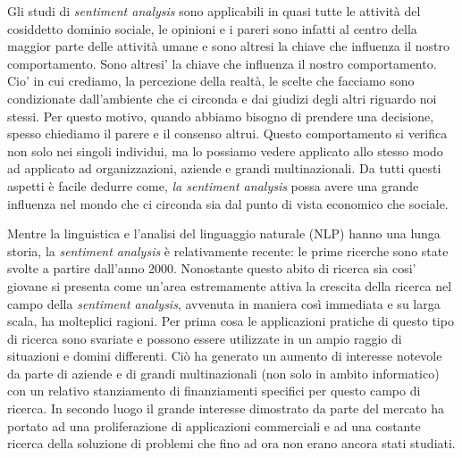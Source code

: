 \documentclass[a4paper,12pt,openright,twoside]{report}
\theoremstyle{definition}
\begin{document}
Gli studi di \emph{sentiment analysis} sono applicabili in quasi tutte
le attività del cosiddetto dominio sociale, le opinioni e i pareri 
sono infatti al centro della maggior parte delle attività umane e sono 
altresi la chiave che influenza il nostro comportamento. Sono altresi' la 
chiave che influenza il nostro 
comportamento. Cio' in cui crediamo, la percezione della realtà, le scelte che facciamo
sono condizionate dall’ambiente che ci circonda e dai giudizi 
degli altri riguardo noi stessi.
Per questo motivo, quando abbiamo bisogno
di prendere una decisione, spesso chiediamo il parere e il consenso altrui.
Questo comportamento si verifica non solo 
nei singoli individui, ma lo possiamo  vedere applicato allo stesso modo ad
applicato ad organizzazioni, aziende e grandi multinazionali.
Da tutti questi aspetti è facile dedurre 
come, \emph{la sentiment analysis} possa avere una grande influenza nel mondo che 
ci circonda sia dal punto di vista economico che sociale.

Mentre la linguistica e l'analisi del linguaggio naturale (NLP) hanno una lunga
storia, la \emph{sentiment analysis} è relativamente recente: le prime ricerche
sono state svolte a partire dall'anno 2000. Nonostante questo abito di ricerca sia cosi' giovane 
si presenta come un'area estremamente attiva 
la crescita della ricerca nel campo della \emph{sentiment analysis}, avvenuta in maniera così immediata e su larga scala, 
ha molteplici ragioni. 
Per prima cosa le applicazioni pratiche 
di questo tipo di ricerca sono svariate e possono essere utilizzate in un ampio raggio di 
situazioni e domini differenti. Ciò ha generato un aumento di interesse notevole da parte di
aziende e di grandi multinazionali (non solo in ambito informatico)
con un relativo stanziamento di finanziamenti specifici per questo campo di ricerca.
In secondo luogo il grande interesse dimostrato da parte del mercato ha portato ad una proliferazione di 
applicazioni commerciali e ad una costante ricerca della soluzione di problemi
che fino ad ora non erano ancora stati studiati.
\end{document}
